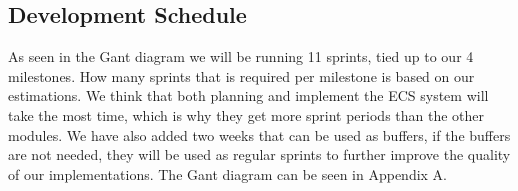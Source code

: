 \subsection{Development Schedule}
As seen in the Gant diagram we will be running 11 sprints, tied up to our 4 milestones.
How many sprints that is required per milestone is based on our estimations. 
We think that both planning and implement the ECS system will take the most time,
which is why they get more sprint periods than the other modules.
We have also added two weeks that can be used as buffers, if the buffers are not needed, 
they will be used as regular sprints to further improve the quality of our implementations.
The Gant diagram can be seen in Appendix A.